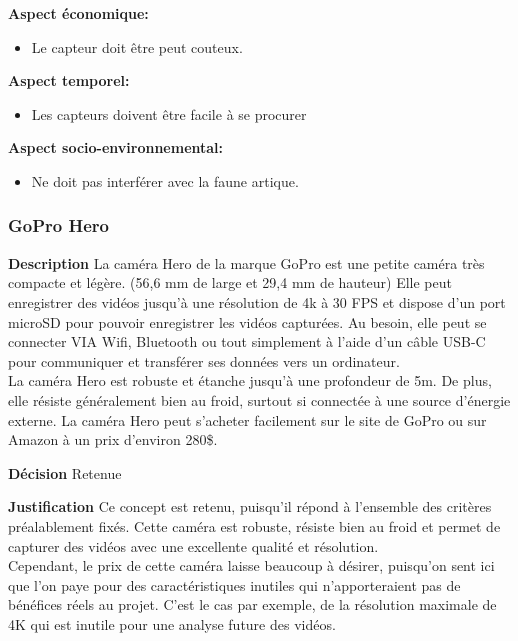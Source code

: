 \noindent\textbf{Aspect économique:}
\begin{itemize}
    \item Le capteur doit être peut couteux.
\end{itemize}

\noindent\textbf{Aspect temporel:}
\begin{itemize}
    \item Les capteurs doivent être facile à se procurer
\end{itemize}

\noindent\textbf{Aspect socio-environnemental:}
\begin{itemize}
    \item Ne doit pas interférer avec la faune artique.
\end{itemize}


\subsubsection{GoPro Hero}
\label{sec:gopro}
\noindent\textbf{Description} La caméra Hero de la marque GoPro est une petite caméra très compacte et légère. (56,6 mm de large et 29,4 mm de hauteur) Elle peut enregistrer des vidéos jusqu'à une résolution de 4k à 30 FPS et dispose d'un port microSD pour pouvoir enregistrer les vidéos capturées. Au besoin, elle peut se connecter VIA Wifi, Bluetooth ou tout simplement à l'aide d'un câble USB-C pour communiquer et transférer ses données vers un ordinateur. 
\\

La caméra Hero est robuste et étanche jusqu'à une profondeur de 5m. De plus, elle résiste généralement bien au froid, surtout si connectée à une source d'énergie externe. La caméra Hero peut s'acheter facilement sur le site de GoPro ou sur Amazon à un prix d'environ 280\$.
\smallskip

\noindent\textbf{Décision} Retenue
\smallskip

\noindent\textbf{Justification} Ce concept est retenu, puisqu'il répond à l'ensemble des critères préalablement fixés. Cette caméra est robuste, résiste bien au froid et permet de capturer des vidéos avec une excellente qualité et résolution. 
\\

Cependant, le prix de cette caméra laisse beaucoup à désirer, puisqu'on sent ici que l'on paye pour des caractéristiques inutiles qui n'apporteraient pas de bénéfices réels au projet. C'est le cas par exemple, de la résolution maximale de 4K qui est inutile pour une analyse future des vidéos.
\smallskip

